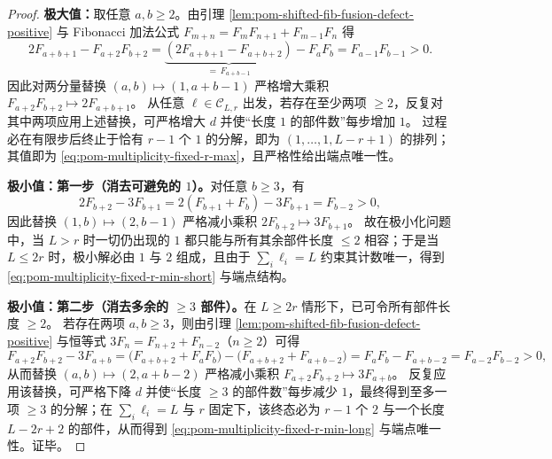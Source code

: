\begin{proof}
\textbf{极大值：}取任意 \(a,b\ge 2\)。由引理 \ref{lem:pom-shifted-fib-fusion-defect-positive} 与 Fibonacci 加法公式
\(
F_{m+n}=F_mF_{n+1}+F_{m-1}F_n
\)
得
\[
2F_{a+b+1}-F_{a+2}F_{b+2}
=\underbrace{(2F_{a+b+1}-F_{a+b+2})}_{=\,F_{a+b-1}}
-F_aF_b
=F_{a-1}F_{b-1}>0.
\]
因此对两分量替换
\(
(a,b)\mapsto(1,a+b-1)
\)
严格增大乘积 \(F_{a+2}F_{b+2}\mapsto 2F_{a+b+1}\)。
从任意 \(\boldsymbol{\ell}\in\mathcal{C}_{L,r}\) 出发，若存在至少两项 \(\ge 2\)，反复对其中两项应用上述替换，可严格增大 \(d\) 并使“长度 \(1\) 的部件数”每步增加 \(1\)。
过程必在有限步后终止于恰有 \(r-1\) 个 \(1\) 的分解，即为 \((1,\dots,1,L-r+1)\) 的排列；其值即为 \eqref{eq:pom-multiplicity-fixed-r-max}，且严格性给出端点唯一性。
\par
\textbf{极小值：第一步（消去可避免的 \(1\)）。}对任意 \(b\ge 3\)，有
\[
2F_{b+2}-3F_{b+1}
=2(F_{b+1}+F_b)-3F_{b+1}
=F_{b-2}>0,
\]
因此替换
\(
(1,b)\mapsto(2,b-1)
\)
严格减小乘积 \(2F_{b+2}\mapsto 3F_{b+1}\)。
故在极小化问题中，当 \(L>r\) 时一切仍出现的 \(1\) 都只能与所有其余部件长度 \(\le 2\) 相容；于是当 \(L\le 2r\) 时，极小解必由 \(1\) 与 \(2\) 组成，且由于 \(\sum_i\ell_i=L\) 约束其计数唯一，得到 \eqref{eq:pom-multiplicity-fixed-r-min-short} 与端点结构。
\par
\textbf{极小值：第二步（消去多余的 \(\ge 3\) 部件）。}在 \(L\ge 2r\) 情形下，已可令所有部件长度 \(\ge 2\)。
若存在两项 \(a,b\ge 3\)，则由引理 \ref{lem:pom-shifted-fib-fusion-defect-positive} 与恒等式 \(3F_n=F_{n+2}+F_{n-2}\)（\(n\ge 2\)）可得
\[
F_{a+2}F_{b+2}-3F_{a+b}
=\bigl(F_{a+b+2}+F_aF_b\bigr)-\bigl(F_{a+b+2}+F_{a+b-2}\bigr)
=F_aF_b-F_{a+b-2}
=F_{a-2}F_{b-2}>0,
\]
从而替换
\(
(a,b)\mapsto(2,a+b-2)
\)
严格减小乘积 \(F_{a+2}F_{b+2}\mapsto 3F_{a+b}\)。
反复应用该替换，可严格下降 \(d\) 并使“长度 \(\ge 3\) 的部件数”每步减少 \(1\)，最终得到至多一项 \(\ge 3\) 的分解；在 \(\sum_i\ell_i=L\) 与 \(r\) 固定下，该终态必为 \(r-1\) 个 \(2\) 与一个长度 \(L-2r+2\) 的部件，从而得到 \eqref{eq:pom-multiplicity-fixed-r-min-long} 与端点唯一性。证毕。
\end{proof}

